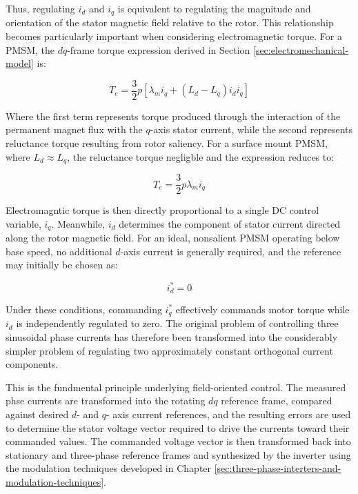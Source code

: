 \documentclass{article}
\begin{document}
Thus, regulating $i_d$ and $i_q$ is equivalent to regulating the magnitude and orientation of the stator magnetic field relative to the rotor. This relationship becomes particularly important when considering electromagnetic torque. For a PMSM, the $dq$-frame torque expression derived in Section \ref{sec:electromechanical-model} is:

\begin{equation}
    T_e = \frac{3}{2}p[\lambda_mi_q + (L_d - L_q)i_di_q]
\end{equation}

Where the first term represents torque produced through the interaction of the permanent magnet flux with the $q$-axis stator current, while the second represents reluctance torque resulting from rotor saliency. For a surface mount PMSM, where $L_d \approx L_q$, the reluctance torque negligble and the expression reduces to:

\begin{equation}
    T_e = \frac{3}{2}p\lambda_mi_q
\end{equation}

Electromagntic torque is then directly proportional to a single DC control variable, $i_q$. Meanwhile, $i_d$ determines the component of stator current directed along the rotor magnetic field. For an ideal, nonsalient PMSM operating below base speed, no additional $d$-axis current is generally required, and the reference may initially be chosen as:

\begin{equation}
    i_d^* = 0
\end{equation}

Under these conditions, commanding $i_q^*$ effectively commands motor torque while $i_d$ is independently regulated to zero. The original problem of controlling three sinusoidal phase currents has therefore been transformed into the considerably simpler problem of regulating two approximately constant orthogonal current components. 

This is the fundmental principle underlying field-oriented control. The measured phse currents are transformed into the rotating $dq$ reference frame, compared against desired $d$- and $q$- axis current references, and the resulting errors are used to determine the stator voltage vector required to drive the currents toward their commanded values. The commanded voltage vector is then transformed back into stationary and three-phase reference frames and synthesized by the inverter using the modulation techniques developed in Chapter \ref{sec:three-phase-interters-and-modulation-techniques}. 
\end{document}

